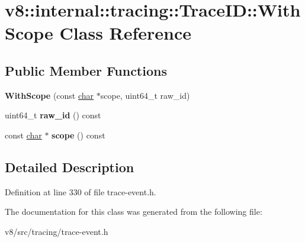 \hypertarget{classv8_1_1internal_1_1tracing_1_1TraceID_1_1WithScope}{}\section{v8\+:\+:internal\+:\+:tracing\+:\+:Trace\+ID\+:\+:With\+Scope Class Reference}
\label{classv8_1_1internal_1_1tracing_1_1TraceID_1_1WithScope}
\subsection*{Public Member Functions}
\begin{DoxyCompactItemize}
\item 
\mbox{\label{classv8_1_1internal_1_1tracing_1_1TraceID_1_1WithScope_ad760cc569a35f3a48ef15f750c600bc4}} 
{\bfseries With\+Scope} (const \mbox{\hyperlink{classchar}{char}} $\ast$scope, uint64\+\_\+t raw\+\_\+id)
\item 
\mbox{\label{classv8_1_1internal_1_1tracing_1_1TraceID_1_1WithScope_aaacd7b648dbc60de76dd1c13a1713a35}} 
uint64\+\_\+t {\bfseries raw\+\_\+id} () const
\item 
\mbox{\label{classv8_1_1internal_1_1tracing_1_1TraceID_1_1WithScope_afb06ab23c37dc7a69ed3c51d128c6e31}} 
const \mbox{\hyperlink{classchar}{char}} $\ast$ {\bfseries scope} () const
\end{DoxyCompactItemize}


\subsection{Detailed Description}


Definition at line 330 of file trace-\/event.\+h.



The documentation for this class was generated from the following file\+:\begin{DoxyCompactItemize}
\item 
v8/src/tracing/trace-\/event.\+h\end{DoxyCompactItemize}
